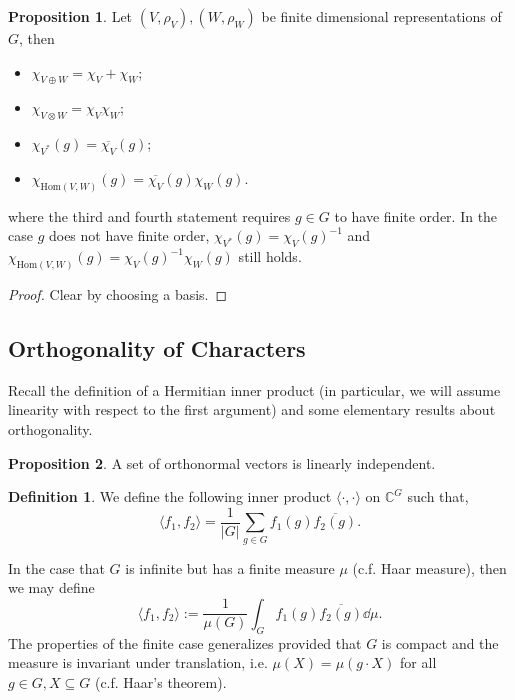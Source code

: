 \documentclass[]{article}
\theoremstyle{definition}
\theoremstyle{definition}
\newtheorem{definition}{Definition}[section]
\newtheorem{proposition}{Proposition}[section]
\begin{document}
\begin{proposition}
  Let \((V, \rho_V), (W, \rho_W)\) be finite dimensional representations of 
  \(G\), then 
  \begin{itemize}
    \item \(\chi_{V \oplus W} = \chi_V + \chi_W\);
    \item \(\chi_{V \otimes W} = \chi_V \chi_W\);
    \item \(\chi_{V^*}(g) = \overline{\chi_V}(g)\);
    \item \(\chi_{\text{Hom}(V, W)}(g) = \overline{\chi_V}(g) \chi_W(g)\).
  \end{itemize}
  where the third and fourth statement requires \(g \in G\) to have finite order.
  In the case \(g\) does not have finite order, 
  \(\chi_{V^*}(g) = \chi_V(g)^{-1}\) and 
  \(\chi_{\text{Hom}(V, W)}(g) = \chi_V(g)^{-1} \chi_W(g)\) still holds.
\end{proposition}
\begin{proof}
  Clear by choosing a basis.
\end{proof}

\subsection{Orthogonality of Characters}

Recall the definition of a Hermitian inner product (in particular, we will 
assume linearity with respect to the first argument) and some elementary 
results about orthogonality. 

\begin{proposition}
  A set of orthonormal vectors is linearly independent.
\end{proposition}

\begin{definition}
  We define the following inner product 
  \(\langle \cdot, \cdot \rangle\) on \(\mathbb{C}^G\) such that, 
  \[\langle f_1, f_2 \rangle = \frac{1}{|G|} \sum_{g \in G} f_1(g) 
    \overline{f_2(g)}.\]
\end{definition}

In the case that \(G\) is infinite but has a finite measure \(\mu\) 
(c.f. Haar measure), then we may define 
\[\langle f_1, f_2 \rangle := \frac{1}{\mu(G)} \int_G f_1(g) 
  \overline{f_2(g)} \dd \mu.\]
The properties of the finite case generalizes provided that \(G\) is compact 
and the measure is invariant under translation, i.e. 
\(\mu(X) = \mu(g \cdot X)\) for all \(g \in G, X \subseteq G\) 
(c.f. Haar's theorem).
\end{document}
